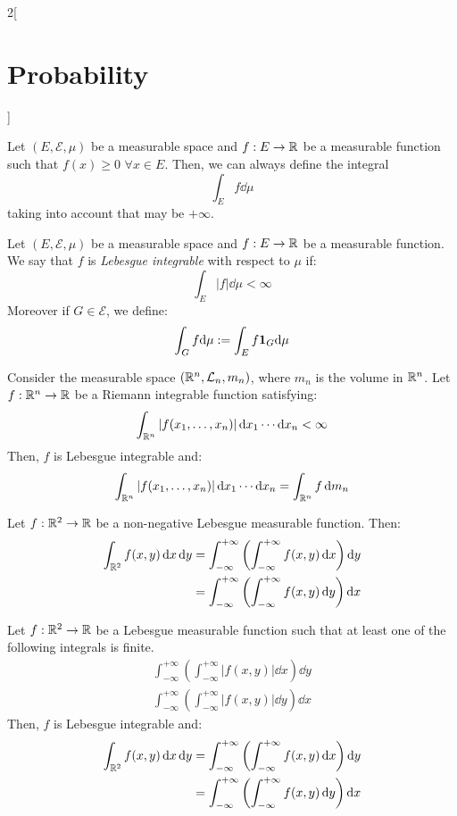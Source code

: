 \documentclass[../../../main_math.tex]{subfiles}
\begin{document}
\begin{multicols}{2}[\section{Probability}]
\begin{definition}
  \end{definition}
  \begin{proposition}
    Let $(E,\mathcal{E},\mu)$ be a measurable space and $f:E\rightarrow\mathbb{R}$ be a measurable function such that $f(x)\geq 0$ $\forall x\in E$. Then, we can always define the integral $$\int_Ef\dd\mu$$ taking into account that may be $+\infty$.
  \end{proposition}
  \begin{definition}
    Let $(E,\mathcal{E},\mu)$ be a measurable space and $f:E\rightarrow\mathbb{R}$ be a measurable function. We say that $f$ is \emph{Lebesgue integrable} with respect to $\mu$ if: $$\int_E|f|\dd\mu<\infty$$
    Moreover if $G\in\mathcal{E}$, we define: $$\int_Gf\dd\mu:=\int_Ef\boldsymbol{\mathrm{1}}_{G}\dd\mu$$
  \end{definition}
  \begin{proposition}
    Consider the measurable space $(\mathbb{R}^n,\mathcal{L}_n,m_n)$, where $m_n$ is the volume in $\mathbb{R}^n$. Let $f:\mathbb{R}^n\rightarrow\mathbb{R}$ be a Riemann integrable function satisfying: $$\int_{\mathbb{R}^n}|f(x_1,\ldots,x_n)|\dd{x_1}\cdots\dd{x_n}<\infty$$
    Then, $f$ is Lebesgue integrable and: $$\int_{\mathbb{R}^n}|f(x_1,\ldots,x_n)|\dd{x_1}\cdots\dd{x_n}=\int_{\mathbb{R}^n}f\dd{m_n}$$
  \end{proposition}
  \begin{theorem}
    Let $f:\mathbb{R}^2\rightarrow\mathbb{R}$ be a non-negative Lebesgue measurable function. Then:
    \begin{align*}
      \int_{\mathbb{R}^2}f(x,y)\dd{x}\dd{y} & =\int_{-\infty}^{+\infty}\left(\int_{-\infty}^{+\infty}f(x,y)\dd{x}\right)\dd{y} \\
                                     & =\int_{-\infty}^{+\infty}\left(\int_{-\infty}^{+\infty}f(x,y)\dd{y}\right)\dd{x}
    \end{align*}
  \end{theorem}
  \begin{theorem}
    Let $f:\mathbb{R}^2\rightarrow\mathbb{R}$ be a Lebesgue measurable function such that at least one of the following integrals is finite.
    \begin{gather*}
      \int_{-\infty}^{+\infty}\left(\int_{-\infty}^{+\infty}|f(x,y)|\dd{x}\right)\dd{y}\\
      \int_{-\infty}^{+\infty}\left(\int_{-\infty}^{+\infty}|f(x,y)|\dd{y}\right)\dd{x}
    \end{gather*}
    Then, $f$ is Lebesgue integrable and:
    \begin{align*}
      \int_{\mathbb{R}^2}f(x,y)\dd{x}\dd{y} & =\int_{-\infty}^{+\infty}\left(\int_{-\infty}^{+\infty}f(x,y)\dd{x}\right)\dd{y} \\
                                     & =\int_{-\infty}^{+\infty}\left(\int_{-\infty}^{+\infty}f(x,y)\dd{y}\right)\dd{x}
    \end{align*}
  \end{theorem}

\end{multicols}
\end{document}
